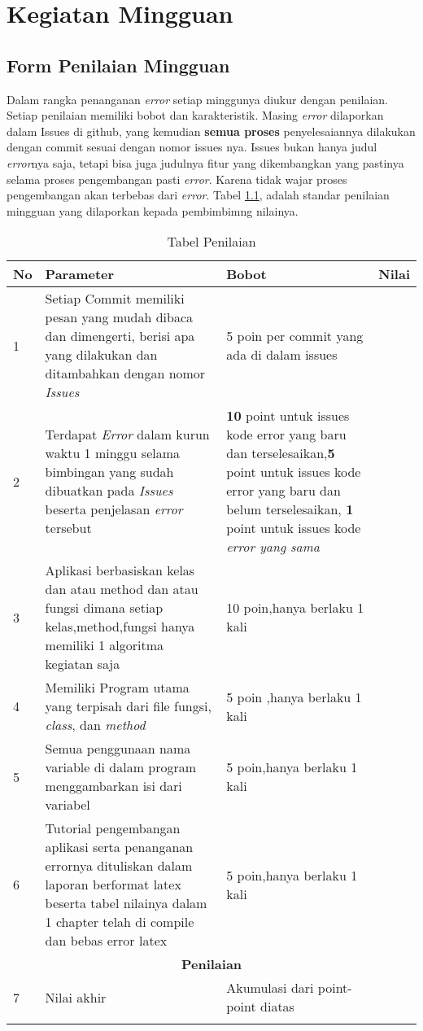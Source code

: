 \chapter{Kegiatan Mingguan}

\section{Form Penilaian Mingguan}
\par
Dalam rangka penanganan \textit{error} setiap minggunya diukur dengan penilaian. Setiap penilaian memiliki bobot dan karakteristik. 
Masing \textit{error} dilaporkan dalam Issues di github, yang kemudian \textbf{semua proses} penyelesaiannya dilakukan dengan commit sesuai dengan nomor issues nya.
Issues bukan hanya judul \textit{error}nya saja, tetapi bisa juga judulnya fitur yang dikembangkan yang pastinya selama proses pengembangan pasti \textit{error}.
Karena tidak wajar proses pengembangan akan terbebas dari \textit{error}. Tabel \ref{table:penilaian}, adalah standar penilaian mingguan yang dilaporkan kepada pembimbimng nilainya.

 \begin{longtable}
{|p{}|p{}|p{}|p{}|}
\caption{Tabel Penilaian}\\
\hline
No&Parameter&Bobot&Nilai\\
\hline
1 &Setiap Commit memiliki pesan yang mudah dibaca dan dimengerti, berisi apa yang dilakukan dan ditambahkan dengan nomor \textit{Issues}&5 poin per commit yang ada di dalam issues& \\ \hline
2 &Terdapat \textit{Error} dalam kurun waktu 1 minggu selama bimbingan yang sudah dibuatkan pada \textit{Issues} beserta penjelasan \textit{error} tersebut&\textbf{10} point untuk issues kode error yang baru dan terselesaikan,\textbf{5} point untuk issues kode error yang baru dan belum terselesaikan, \textbf{1} point untuk issues kode \textit{error yang sama}& \\ \hline
3 &Aplikasi berbasiskan kelas dan atau method dan atau fungsi dimana setiap kelas,method,fungsi hanya memiliki 1 algoritma kegiatan saja&10 poin,hanya berlaku 1 kali & \\ \hline
4 &Memiliki Program utama yang terpisah dari file fungsi, \textit{class}, dan \textit{method}&5 poin ,hanya berlaku 1 kali & \\ \hline
5 &Semua penggunaan nama variable di dalam program menggambarkan isi dari variabel& 5 poin,hanya berlaku 1 kali& \\ \hline
6 &Tutorial pengembangan aplikasi serta penanganan errornya dituliskan dalam laporan berformat latex beserta tabel nilainya dalam 1 chapter telah di compile dan bebas error latex & 5 poin,hanya berlaku 1 kali& \\ \hline
\multicolumn{4}{c}{\textbf{Penilaian}}\\ \hline

7 &Nilai akhir&Akumulasi dari point-point diatas & \\ \hline

\label{table:penilaian}
\end{longtable}

